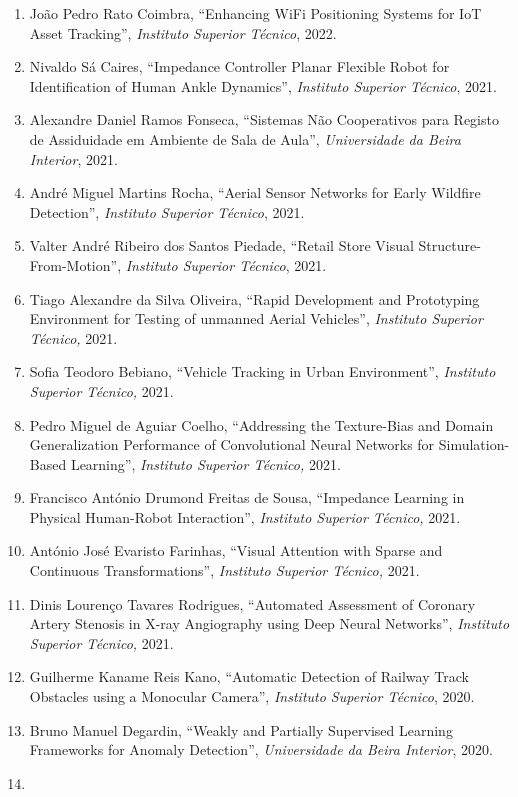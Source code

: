 \documentclass[
]{article}
\begin{document}
\begin{enumerate}
\item
  João Pedro Rato Coimbra, ``Enhancing WiFi Positioning Systems for IoT
  Asset Tracking'', \emph{Instituto Superior Técnico}, 2022.
\item
  Nivaldo Sá Caires, ``Impedance Controller Planar Flexible Robot for
  Identification of Human Ankle Dynamics'', \emph{Instituto Superior
  Técnico}, 2021.
\item
  Alexandre Daniel Ramos Fonseca, ``Sistemas Não Cooperativos para
  Registo de Assiduidade em Ambiente de Sala de Aula'',
  \emph{Universidade da Beira Interior}, 2021.
\item
  André Miguel Martins Rocha, ``Aerial Sensor Networks for Early
  Wildfire Detection'', \emph{Instituto Superior Técnico}, 2021.
\item
  Valter André Ribeiro dos Santos Piedade, ``Retail Store Visual
  Structure-From-Motion'', \emph{Instituto Superior Técnico}, 2021.
\item
  Tiago Alexandre da Silva Oliveira, ``Rapid Development and Prototyping
  Environment for Testing of unmanned Aerial Vehicles'', \emph{Instituto
  Superior Técnico,} 2021.
\item
  Sofia Teodoro Bebiano, ``Vehicle Tracking in Urban Environment'',
  \emph{Instituto Superior Técnico,} 2021.
\item
  Pedro Miguel de Aguiar Coelho, ``Addressing the Texture-Bias and
  Domain Generalization Performance of Convolutional Neural Networks for
  Simulation-Based Learning'', \emph{Instituto Superior Técnico,} 2021.
\item
  Francisco António Drumond Freitas de Sousa, ``Impedance Learning in
  Physical Human-Robot Interaction'', \emph{Instituto Superior Técnico,}
  2021.
\item
  António José Evaristo Farinhas, ``Visual Attention with Sparse and
  Continuous Transformations'', \emph{Instituto Superior Técnico,} 2021.
\item
  Dinis Lourenço Tavares Rodrigues, ``Automated Assessment of Coronary
  Artery Stenosis in X-ray Angiography using Deep Neural Networks'',
  \emph{Instituto Superior Técnico,} 2021.
\item
  Guilherme Kaname Reis Kano, ``Automatic Detection of Railway Track
  Obstacles using a Monocular Camera'', \emph{Instituto Superior
  Técnico}, 2020.
\item
  Bruno Manuel Degardin, ``Weakly and Partially Supervised Learning
  Frameworks for Anomaly Detection'', \emph{Universidade da Beira
  Interior}, 2020.
\item

\end{enumerate}
\end{document}
